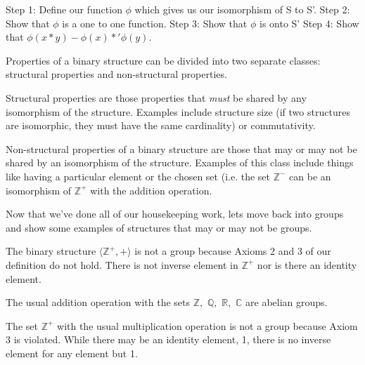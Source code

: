 Step 1: Define our function $\phi$ which gives us our isomorphism of S to S'.\newline
	Step 2: Show that $\phi$ is a one to one function.\newline
	Step 3: Show that $\phi$ is onto S' \newline
	Step 4: Show that $\phi (x*y) - \phi (x) *' \phi (y).$ \newline

Properties of a binary structure can be divided into two separate classes: structural properties and non-structural properties. \newline

Structural properties are those properties that \emph{must} be shared by any isomorphism of the structure. Examples include structure size (if two structures are isomorphic, they must have the same cardinality) or commutativity.\newline

Non-structural properties of a binary structure are those that may or may not be shared by an isomorphism of the structure. Examples of this class include things like having a particular element or the chosen set (i.e. the set $\mathbb{Z}^-$ can be an isomorphism of $\mathbb{Z}^+$ with the addition operation. \newline

Now that we've done all of our housekeeping work, lets move back into groups and show some examples of structures that may or may not be groups.

\begin{example}
 The binary structure $\langle \mathbb{Z}^+, + \rangle$ is not a group because Axioms 2 and 3 of our definition do not hold. There is not inverse element in $\mathbb{Z}^+$ nor is there an identity element.
\end{example}

\begin{example}
The usual addition operation with the sets $\mathbb{Z},$ $\mathbb{Q,}$ $\mathbb{R},$ $\mathbb{C}$ are abelian groups.
\end{example}

\begin{example}
The set $\mathbb{Z}^+$ with the usual multiplication operation is not a group because Axiom 3 is violated.\newline
While there may be an identity element, 1, there is no inverse element for any element but 1.
\end{example}

